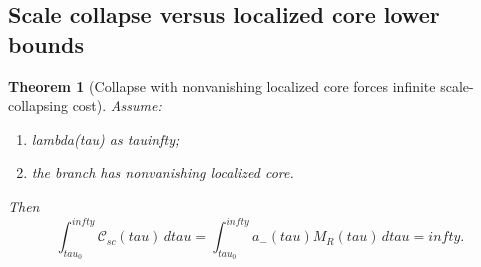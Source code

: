 \documentclass[11pt]{amsart}
\def\({}%
\def\){}%
\def\mathrm#1{#1}%
\def\tau{tau}%
\def\lambda{lambda}%
\def\infty{infty}%
\theoremstyle{plain}
\newtheorem{theorem}{Theorem}[section]
\theoremstyle{definition}
\theoremstyle{remark}
\begin{document}
\subsection{Scale collapse versus localized core lower bounds}

\begin{theorem}[Collapse with nonvanishing localized core forces infinite
scale-collapsing cost]\label{paper5:thm:collapse-core-floor}
Assume:
\begin{enumerate}[label=(\arabic*)]
  \item \(\lambda(\tau)\) as \(\tau\to\infty\);
  \item the branch has nonvanishing localized core.
\end{enumerate}
Then
\[
  \int_{\tau_0}^{\infty}\mathcal C_{\mathrm{sc}}(\tau)
  \,d\tau
  =\int_{\tau_0}^{\infty}a_-(\tau)M_R(\tau)
  \,d\tau=\infty.
\]
\end{theorem}
\end{document}
